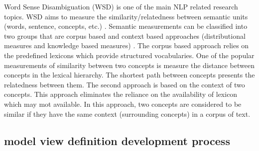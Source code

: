 \documentclass[Journal, InsideFigs, DoubleSpace]{ascelike} %
\begin{document}
Word Sense Disambiguation (WSD) is one of the main NLP related research topics. WSD aims to measure the similarity/relatedness between semantic units (words, sentence, concepts, etc.) \cite{harispe15}. Semantic measurements can be classified into two groups that are corpus based and context based approaches (distributional measures and knowledge based measures) \cite{Harispe13}. The corpus based approach relies on the predefined lexicons which provide structured vocabularies. One of the popular measurements of similarity between two concepts is measure the distance between concepts in the lexical hierarchy. The shortest path between concepts presents the relatedness between them. The second approach is based on the context of two concepts. This approach eliminates the reliance on the availability of lexicon which may mot available. In this approach, two concepts are considered to be similar if they have the same context (surrounding concepts) in a corpus of text.





\subsection{model view definition development process}
\end{document}
